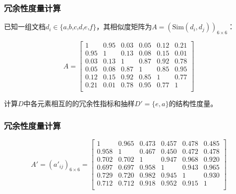 \documentclass{../presentation}
\newcommand{\Sim}{\text{Sim}}
\begin{document}
    \begin{frame}
        \frametitle{冗余性度量计算}

        已知一组文档$d_i \in\{\textit{a,b,c,d,e,f}\}$，其相似度矩阵为$A = (\Sim(d_i, d_j))_{6\times 6}$：

        \begin{equation}
            A = \begin{bmatrix}
                1 & 0.95 & 0.03 & 0.05 & 0.12 & 0.21 \\
                0.95 & 1 & 0.13 & 0.08 & 0.15 & 0.01 \\
                0.03 & 0.13 & 1 & 0.87 & 0.92 & 0.78 \\
                0.05 & 0.08 & 0.87 & 1 & 0.85 & 0.95 \\
                0.12 & 0.15 & 0.92 & 0.85 & 1 & 0.77 \\
                0.21 & 0.01 & 0.78 & 0.95 & 0.77 & 1 \\
            \end{bmatrix}
        \end{equation}

        计算$D$中各元素相互的的冗余性指标和抽样$D' = \{e, a\}$的结构性度量。

    \end{frame}

    \begin{frame}
        \frametitle{冗余性度量计算}

        \begin{equation}
            A' = \left(a'_{ij}\right)_{6\times 6} = \begin{bmatrix}
                1 & 0.965 & 0.473 & 0.457 & 0.478 & 0.485 \\
                0.958 & 1 & 0.467 & 0.450 & 0.472 & 0.478 \\
                0.702 & 0.702 & 1 & 0.947 & 0.968 & 0.920 \\
                0.697 & 0.697 & 0.958 & 1 & 0.943 & 0.965 \\
                0.729 & 0.720 & 0.982 & 0.945 & 1 & 0.930 \\
                0.712 & 0.712 & 0.918 & 0.952 & 0.915 & 1 \\
            \end{bmatrix}
        \end{equation}

    \end{frame}
\end{document}
